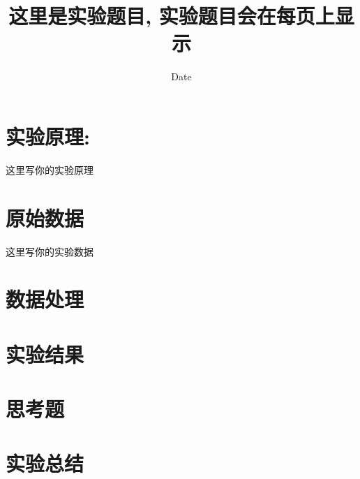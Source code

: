 \documentclass[12pt]{ustcreport}
\date{Date}			%
\title{这里是实验题目, 实验题目会在每页上显示}
\begin{document}
\section{实验原理:}
这里写你的实验原理 \\
\lipsum[1]


\section{原始数据}
这里写你的实验数据 \\
\lipsum[1]


\section{数据处理}


\section{实验结果}


\section{思考题}


\section{实验总结}
\end{document}
